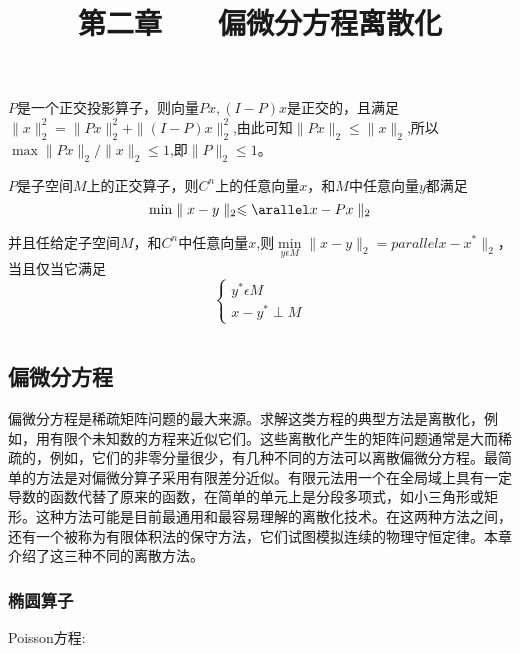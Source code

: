 \documentclass{article}
\begin{document}
$P$是一个正交投影算子，则向量$Px,(I-P)x$是正交的，且满足$\parallel x\parallel _2^2=\parallel Px\parallel _2^2+\parallel (I-P)x\parallel _2^2$,由此可知$\parallel Px\parallel _2\leqslant \parallel x\parallel _2$,所以$\max \parallel Px\parallel _2 /\parallel x\parallel _2\leqslant 1$,即$\parallel P\parallel _2\leqslant 1$。

\begin{thm}
$P$是子空间$M$上的正交算子，则$C^n$上的任意向量$x$，和$M$中任意向量$y$都满足
$$\min \parallel x-y\parallel _2\leqslant \arallel x-Px\parallel _2$$
\end{thm}

并且任给定子空间$M$，和$C^n$中任意向量$x$,则$\min \limits_{y\epsilon M} \parallel x-y\parallel _2= parallel x-x^*\parallel _2$，当且仅当它满足
$$\begin{cases}
y^*  \epsilon M \\
x-y^*\perp M
\end{cases}
$$










\title{第二章$\qquad$偏微分方程离散化}
\maketitle  %
\section{}
\subsection{偏微分方程}
偏微分方程是稀疏矩阵问题的最大来源。求解这类方程的典型方法是离散化，例如，用有限个未知数的方程来近似它们。这些离散化产生的矩阵问题通常是大而稀疏的，例如，它们的非零分量很少，有几种不同的方法可以离散偏微分方程。最简单的方法是对偏微分算子采用有限差分近似。有限元法用一个在全局域上具有一定导数的函数代替了原来的函数，在简单的单元上是分段多项式，如小三角形或矩形。这种方法可能是目前最通用和最容易理解的离散化技术。在这两种方法之间，还有一个被称为有限体积法的保守方法，它们试图模拟连续的物理守恒定律。本章介绍了这三种不同的离散方法。

\subsubsection{椭圆算子}
Poisson方程:                   
\end{document}
